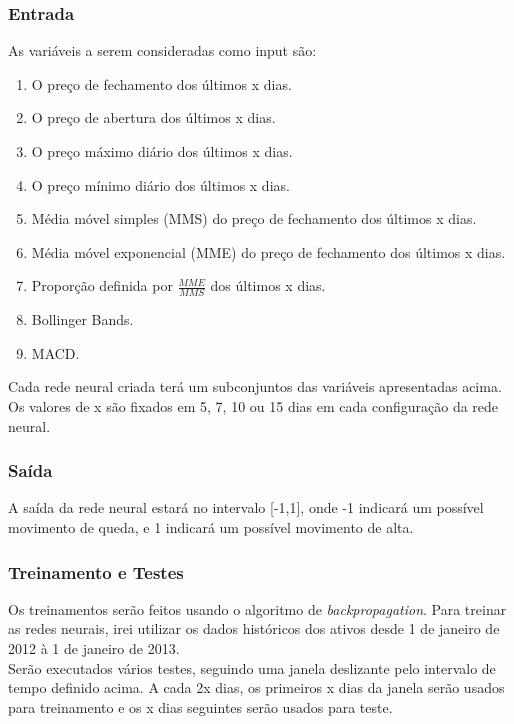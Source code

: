\documentclass[12pt]{article}
\begin{document}
\subsubsection{Entrada}
As variáveis a serem consideradas como input são:
\begin{enumerate}
\item O preço de fechamento dos últimos x dias.
\item O preço de abertura dos últimos x dias.
\item O preço máximo diário dos últimos x dias.
\item O preço mínimo diário dos últimos x dias.
\item Média móvel simples (MMS) do preço de fechamento dos últimos x dias.
\item Média móvel exponencial (MME) do preço de fechamento dos últimos x dias.
\item Proporção definida por $\frac{MME}{MMS}$ dos últimos x dias.
\item Bollinger Bands.
\item MACD.
\end{enumerate}

Cada rede neural criada terá um subconjuntos das variáveis apresentadas acima. Os valores de x são fixados em 5, 7, 10 ou 15 dias em cada configuração da rede neural.

\subsubsection{Saída}
A saída da rede neural estará no intervalo [-1,1], onde -1 indicará um possível movimento de queda, e 1 indicará um possível movimento de alta.

\subsubsection{Treinamento e Testes}
Os treinamentos serão feitos usando o algoritmo de \emph{backpropagation}. Para treinar as redes neurais, irei utilizar os dados históricos dos ativos desde 1 de janeiro de 2012 à 1 de janeiro de 2013.\\
Serão executados vários testes, seguindo uma janela deslizante pelo intervalo de tempo definido acima. A cada 2x dias, os primeiros x dias da janela serão usados para treinamento e os x dias seguintes serão usados para teste.
\end{document}
